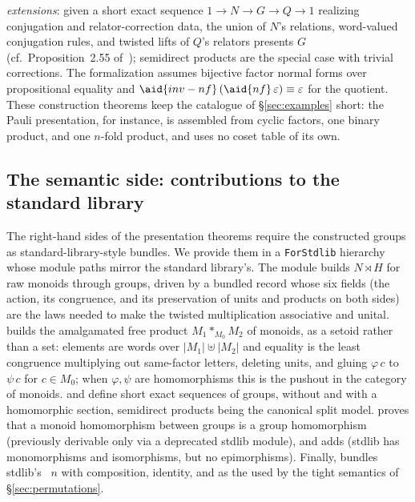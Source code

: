 \emph{extensions}: given a short exact sequence
$1 \to N \to G \to Q \to 1$ realizing conjugation and relator-correction
data, the union of $N$'s relations, word-valued conjugation rules, and
twisted lifts of $Q$'s relators presents $G$
(cf.\ Proposition~2.55 of~\cite{holt2005handbook}); semidirect products are
the special case with trivial corrections.  The formalization assumes
bijective factor normal forms over propositional equality and
$\aid{inv-nf}\,(\aid{nf}\,\varepsilon) \equiv \varepsilon$ for the quotient.
These construction theorems
keep the catalogue of \S\ref{sec:examples} short: the Pauli
presentation, for instance, is assembled from cyclic factors, one
binary product, and one $n$-fold product, and uses no coset table
of its own.

\subsection{The semantic side: contributions to the standard library}\label{sec:forstdlib}

The right-hand sides of the presentation theorems require the constructed
groups as standard-library-style bundles.  We provide them
in a \texttt{ForStdlib} hierarchy whose module paths mirror the standard
library's.
The module  builds $N \rtimes H$
for raw monoids through groups, driven by a bundled  record
whose six fields (the action, its congruence, and its preservation of
units and products on both sides) are the laws needed to make the
twisted multiplication associative and unital.
 builds the amalgamated free product
$M_1 \ast_{M_0} M_2$ of monoids, as a setoid rather than a set:
elements are words over $|M_1| \uplus |M_2|$ and equality is the least
congruence multiplying out same-factor letters, deleting units, and gluing
$\varphi\,c$ to $\psi\,c$ for $c \in M_0$; when $\varphi, \psi$ are
homomorphisms this is the pushout in the category of monoids.
and  define short exact sequences of groups, without
and with a homomorphic section, semidirect products being the canonical
split model.   proves that a monoid
homomorphism between groups is a group homomorphism (previously derivable
only via a deprecated stdlib module), and
 adds  (stdlib
has monomorphisms and isomorphisms, but no epimorphisms).  Finally,
 bundles stdlib's
~$n$ with composition, identity, and  as the
 used by the tight semantics of \S\ref{sec:permutations}.

